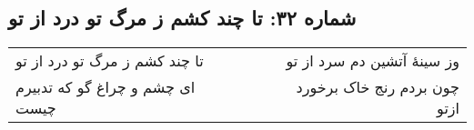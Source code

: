 \begin{center}
\section*{شماره ۳۲: تا چند کشم ز مرگ تو درد از تو}
\label{sec:032}
\begin{longtable}{l p{0.5cm} r}
تا چند کشم ز مرگ تو درد از تو
&&
وز سینهٔ آتشین دم سرد از تو
\\
ای چشم و چراغ گو که تدبیرم چیست
&&
چون بردم رنج خاک برخورد ازتو
\\
\end{longtable}
\end{center}
